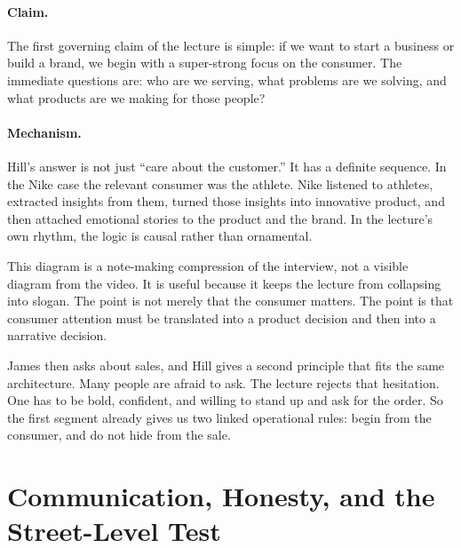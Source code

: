 \paragraph{Claim.} The first governing claim of the lecture is simple: if we want to start a business or build a brand, we begin with a super-strong focus on the consumer. The immediate questions are: who are we serving, what problems are we solving, and what products are we making for those people?

\paragraph{Mechanism.} Hill's answer is not just ``care about the customer.'' It has a definite sequence. In the Nike case the relevant consumer was the athlete. Nike listened to athletes, extracted insights from them, turned those insights into innovative product, and then attached emotional stories to the product and the brand. In the lecture's own rhythm, the logic is causal rather than ornamental.

\begin{figure}
\centering
{}
\end{figure}

This diagram is a note-making compression of the interview, not a visible diagram from the video. It is useful because it keeps the lecture from collapsing into slogan. The point is not merely that the consumer matters. The point is that consumer attention must be translated into a product decision and then into a narrative decision.

James then asks about sales, and Hill gives a second principle that fits the same architecture. Many people are afraid to ask. The lecture rejects that hesitation. One has to be bold, confident, and willing to stand up and ask for the order. So the first segment already gives us two linked operational rules: begin from the consumer, and do not hide from the sale.

\section{Communication, Honesty, and the Street-Level Test}

